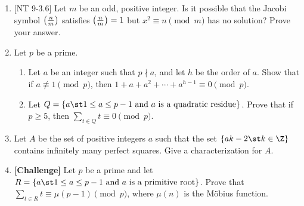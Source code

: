 \documentclass[11pt]{article}
\begin{document}
\begin{enumerate}
\item{}[NT 9-3.6]
Let $m$ be an odd, positive integer.  Is it possible that the Jacobi symbol $\left(\frac{n}{m}\right)$ satisfies $\left(\frac{n}{m}\right)=1$ but $x^2\equiv n\pmod{m}$ has no solution?  Prove your answer.

\item Let $p$ be a prime.
\begin{enumerate}
	\item Let $a$ be an integer such that $p \nmid a$, and let $h$ be the order of $a$.  Show that if $a\not\equiv 1\pmod{p}$, then $1 + a + a^2 + \cdots + a^{h-1} \equiv 0 \pmod{p}$.

	\item  Let $Q = \{a\st \mbox{$1\le a\le p-1$ and $a$ is a quadratic residue}\}$.  Prove that if $p\ge 5$, then $\sum_{t\in Q} t \equiv 0 \pmod{p}$.
\end{enumerate}

\item Let $A$ be the set of positive integers $a$ such that the set $\{ak-2\st k\in\Z\}$ contains infinitely many perfect squares.  Give a characterization for $A$.

\item \textbf{[Challenge]} Let $p$ be a prime and let $R = \{a\st \mbox{$1\le a\le p-1$ and $a$ is a primitive root}\}$.  Prove that $\sum_{t\in R} t \equiv \mu(p-1) \pmod{p}$, where $\mu(n)$ is the M\"obius function.


\end{enumerate}
\end{document}

